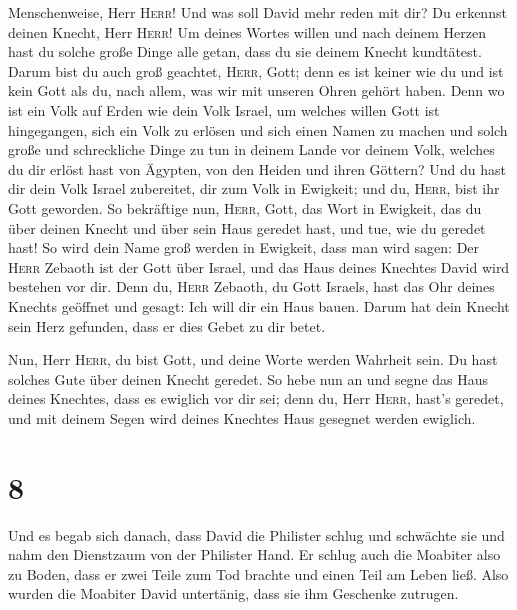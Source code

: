 Menschenweise, Herr \textsc{Herr}!  Und was soll David
mehr reden mit dir? Du erkennst deinen Knecht, Herr \textsc{Herr}!
 Um deines Wortes willen und nach deinem Herzen hast du
solche große Dinge alle getan, dass du sie deinem Knecht kundtätest.
 Darum bist du auch groß geachtet, \textsc{Herr}, Gott;
denn es ist keiner wie du und ist kein Gott als du, nach allem, was wir
mit unseren Ohren gehört haben.  Denn wo ist ein Volk auf
Erden wie dein Volk Israel, um welches willen Gott ist hingegangen, sich
ein Volk zu erlösen und sich einen Namen zu machen und solch große und
schreckliche Dinge zu tun in deinem Lande vor deinem Volk, welches du
dir erlöst hast von Ägypten, von den Heiden und ihren Göttern?
 Und du hast dir dein Volk Israel zubereitet, dir zum
Volk in Ewigkeit; und du, \textsc{Herr}, bist ihr Gott geworden.
 So bekräftige nun, \textsc{Herr}, Gott, das Wort in
Ewigkeit, das du über deinen Knecht und über sein Haus geredet hast, und
tue, wie du geredet hast!  So wird dein Name groß werden
in Ewigkeit, dass man wird sagen: Der \textsc{Herr} Zebaoth ist der Gott
über Israel, und das Haus deines Knechtes David wird bestehen vor dir.
 Denn du, \textsc{Herr} Zebaoth, du Gott Israels, hast
das Ohr deines Knechts geöffnet und gesagt: Ich will dir ein Haus bauen.
Darum hat dein Knecht sein Herz gefunden, dass er dies Gebet zu dir
betet.

 Nun, Herr \textsc{Herr}, du bist Gott, und deine Worte
werden Wahrheit sein. Du hast solches Gute über deinen Knecht geredet.
 So hebe nun an und segne das Haus deines Knechtes, dass
es ewiglich vor dir sei; denn du, Herr \textsc{Herr}, hast's geredet,
und mit deinem Segen wird deines Knechtes Haus gesegnet werden ewiglich.

\hypertarget{section-7}{%
\section{8}\label{section-7}}

 Und es begab sich danach, dass David die Philister schlug
und schwächte sie und nahm den Dienstzaum von der Philister Hand.
 Er schlug auch die Moabiter also zu Boden, dass er zwei
Teile zum Tod brachte und einen Teil am Leben ließ. Also wurden die
Moabiter David untertänig, dass sie ihm Geschenke zutrugen.


